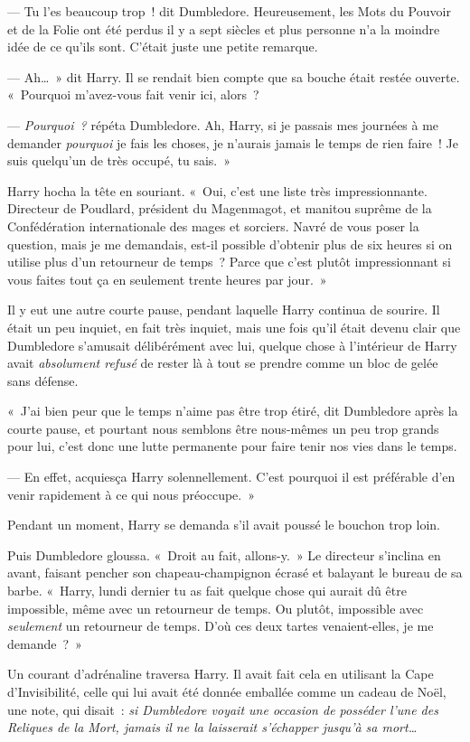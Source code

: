 --- Tu l'es beaucoup trop~! dit Dumbledore.
Heureusement, les Mots du Pouvoir et de la Folie ont été perdus il y a sept siècles et plus personne n'a la moindre idée de ce qu'ils sont.
C'était juste une petite remarque.

--- Ah…~» dit Harry.
Il se rendait bien compte que sa bouche était restée ouverte.
«~Pourquoi m'avez-vous fait venir ici, alors~?

--- \emph{Pourquoi~?} répéta Dumbledore.
Ah, Harry, si je passais mes journées à me demander \emph{pourquoi} je fais les choses, je n'aurais jamais le temps de rien faire~!
Je suis quelqu'un de très occupé, tu sais.~»

Harry hocha la tête en souriant.
«~Oui, c'est une liste très impressionnante.
Directeur de Poudlard, président du Magenmagot, et manitou suprême de la Confédération internationale des mages et sorciers.
Navré de vous poser la question, mais je me demandais, est-il possible d'obtenir plus de six heures si on utilise plus d'un retourneur de temps~?
Parce que c'est plutôt impressionnant si vous faites tout ça en seulement trente heures par jour.~»

Il y eut une autre courte pause, pendant laquelle Harry continua de sourire.
Il était un peu inquiet, en fait très inquiet, mais une fois qu'il était devenu clair que Dumbledore s'amusait délibérément avec lui, quelque chose à l'intérieur de Harry avait \emph{absolument refusé} de rester là à tout se prendre comme un bloc de gelée sans défense.

«~J'ai bien peur que le temps n'aime pas être trop étiré, dit Dumbledore après la courte pause, et pourtant nous semblons être nous-mêmes un peu trop grands pour lui, c'est donc une lutte permanente pour faire tenir nos vies dans le temps.

--- En effet, acquiesça Harry solennellement.
C'est pourquoi il est préférable d'en venir rapidement à ce qui nous préoccupe.~»

Pendant un moment, Harry se demanda s'il avait poussé le bouchon trop loin.

Puis Dumbledore gloussa.
«~Droit au fait, allons-y.~»
Le directeur s'inclina en avant, faisant pencher son chapeau-champignon écrasé et balayant le bureau de sa barbe.
«~Harry, lundi dernier tu as fait quelque chose qui aurait dû être impossible, même avec un retourneur de temps.
Ou plutôt, impossible avec \emph{seulement} un retourneur de temps.
D'où ces deux tartes venaient-elles, je me demande~?~»

Un courant d'adrénaline traversa Harry.
Il avait fait cela en utilisant la Cape d'Invisibilité, celle qui lui avait été donnée emballée comme un cadeau de Noël, une note, qui disait~: \emph{si Dumbledore voyait une occasion de posséder l'une des Reliques de la Mort, jamais il ne la laisserait s'échapper jusqu'à sa mort…}

